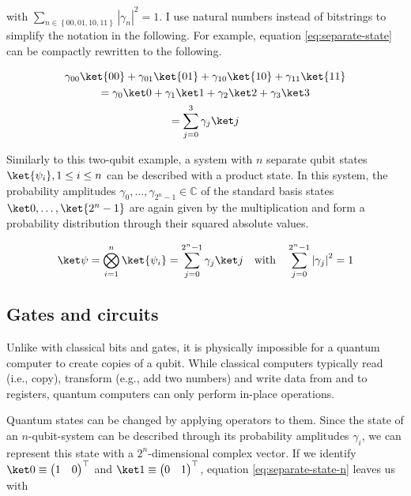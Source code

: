 with $\sum_{n \in \left\{00, 01, 10, 11\right\}} \left|\gamma_n\right|^2 = 1$.
I use natural numbers instead of bitstrings to simplify the notation in the
following.
For example, equation \ref{eq:separate-state} can be compactly rewritten to the
following.

\begin{equation}
    \label{eq:separate-state-natural-numbers}
    \begin{gathered}
            \gamma_{00} \ket{00} + \gamma_{01} \ket{01} + \gamma_{10} \ket{10} + \gamma_{11} \ket{11}\\
        =   \gamma_0 \ket 0 + \gamma_1 \ket 1 + \gamma_2 \ket 2 + \gamma_3 \ket 3\\
        =   \sum_{j=0}^3 \gamma_j \ket j
    \end{gathered}
\end{equation}

Similarly to this two-qubit example, a system with $n$ separate qubit states
$\ket{\psi_i}, 1 \leq i \leq n$ can be described with a product state.
In this system, the probability amplitudes
$\gamma_0, \dots, \gamma_{2^n -1} \in \mathbb C$ of the standard basis states
$\ket 0, \dots, \ket{2^n -1}$ are again given by the multiplication and form a
probability distribution through their squared absolute values.

\begin{equation}
    \label{eq:separate-state-n}
    \ket\psi = \bigotimes_{i=1}^n \ket{\psi_i} = \sum_{j=0}^{2^n -1} \gamma_j \ket j
        \quad\text{with}\quad \sum_{j=0}^{2^n -1} \left|\gamma_j\right|^2 = 1
\end{equation}

\subsection{Gates and circuits}

Unlike with classical bits and gates, it is physically impossible for a quantum
computer to create copies of a qubit.
While classical computers typically read (i.e., copy), transform (e.g., add two
numbers) and write data from and to registers, quantum computers can only
perform in-place operations.

Quantum states can be changed by applying operators to them.
Since the state of an $n$-qubit-system can be described through its probability
amplitudes $\gamma_i$, we can represent this state with a $2^n$-dimensional
complex vector.
If we identify $\ket 0 \equiv \begin{pmatrix}1 & 0\end{pmatrix}^\top$ and
$\ket 1 \equiv \begin{pmatrix}0 & 1\end{pmatrix}^\top$,
equation \ref{eq:separate-state-n} leaves us with

